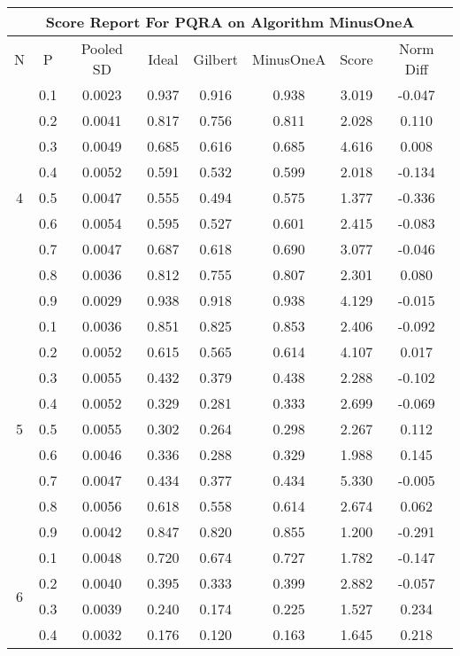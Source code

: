 \documentclass[11pt,a4paper]{report}
\begin{document}
\begin{longtable}{ | c | c || c | c | c | c | c | c | }
\hline
\multicolumn{8}{|c|}{ Score Report For PQRA on Algorithm MinusOneA} \\
\hline
N & P & Pooled SD &  Ideal &  Gilbert & MinusOneA  & Score & Norm Diff \\
 \hline
 \hline
 \endhead
\multirow{9}{*}{4} & 0.1 & 0.0023 & 0.937 & 0.916 & 0.938 & 3.019 & -0.047 \\
 & 0.2 & 0.0041 & 0.817 & 0.756 & 0.811 & 2.028 & 0.110 \\
 & 0.3 & 0.0049 & 0.685 & 0.616 & 0.685 & 4.616 & 0.008 \\
 & 0.4 & 0.0052 & 0.591 & 0.532 & 0.599 & 2.018 & -0.134 \\
 & 0.5 & 0.0047 & 0.555 & 0.494 & 0.575 & 1.377 & -0.336 \\
 & 0.6 & 0.0054 & 0.595 & 0.527 & 0.601 & 2.415 & -0.083 \\
 & 0.7 & 0.0047 & 0.687 & 0.618 & 0.690 & 3.077 & -0.046 \\
 & 0.8 & 0.0036 & 0.812 & 0.755 & 0.807 & 2.301 & 0.080 \\
 & 0.9 & 0.0029 & 0.938 & 0.918 & 0.938 & 4.129 & -0.015 \\
 \hline
\multirow{9}{*}{5} & 0.1 & 0.0036 & 0.851 & 0.825 & 0.853 & 2.406 & -0.092 \\
 & 0.2 & 0.0052 & 0.615 & 0.565 & 0.614 & 4.107 & 0.017 \\
 & 0.3 & 0.0055 & 0.432 & 0.379 & 0.438 & 2.288 & -0.102 \\
 & 0.4 & 0.0052 & 0.329 & 0.281 & 0.333 & 2.699 & -0.069 \\
 & 0.5 & 0.0055 & 0.302 & 0.264 & 0.298 & 2.267 & 0.112 \\
 & 0.6 & 0.0046 & 0.336 & 0.288 & 0.329 & 1.988 & 0.145 \\
 & 0.7 & 0.0047 & 0.434 & 0.377 & 0.434 & 5.330 & -0.005 \\
 & 0.8 & 0.0056 & 0.618 & 0.558 & 0.614 & 2.674 & 0.062 \\
 & 0.9 & 0.0042 & 0.847 & 0.820 & 0.855 & 1.200 & -0.291 \\
 \hline
\multirow{9}{*}{6} & 0.1 & 0.0048 & 0.720 & 0.674 & 0.727 & 1.782 & -0.147 \\
 & 0.2 & 0.0040 & 0.395 & 0.333 & 0.399 & 2.882 & -0.057 \\
 & 0.3 & 0.0039 & 0.240 & 0.174 & 0.225 & 1.527 & 0.234 \\
 & 0.4 & 0.0032 & 0.176 & 0.120 & 0.163 & 1.645 & 0.218 \\

\end{longtable}
\end{document}
